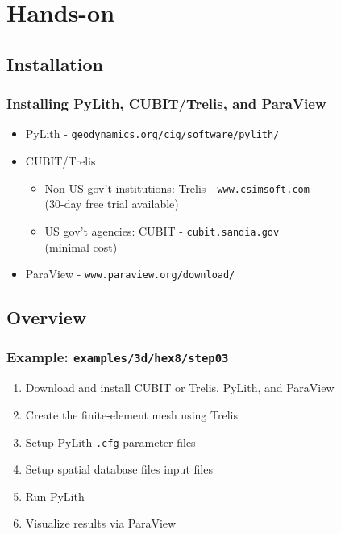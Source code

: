 \documentclass{beamer}
\begin{document}
\section{Hands-on}
\subsection{Installation}

\begin{frame}
  \frametitle{Installing PyLith, CUBIT/Trelis, and ParaView}
  \summary{}

  \begin{itemize}
  \item PyLith - {\tt geodynamics.org/cig/software/pylith/}
  \item CUBIT/Trelis
    \begin{itemize}
    \item Non-US gov't institutions: Trelis - {\tt www.csimsoft.com}\\
      (30-day free trial available)
    \item US gov't agencies: CUBIT - {\tt cubit.sandia.gov}\\
      (minimal cost)
    \end{itemize}
  \item ParaView - {\tt www.paraview.org/download/}
  \end{itemize}

\end{frame}


\subsection{Overview}

\begin{frame}
  \frametitle{Example: {\tt examples/3d/hex8/step03}}
  \summary{}

  \begin{enumerate}
  \item Download and install CUBIT or Trelis, PyLith, and ParaView
  \item Create the finite-element mesh using Trelis
  \item Setup PyLith {\tt .cfg} parameter files
  \item Setup spatial database files input files
  \item Run PyLith
  \item Visualize results via ParaView
  \end{enumerate}

\end{frame}


\end{document}
